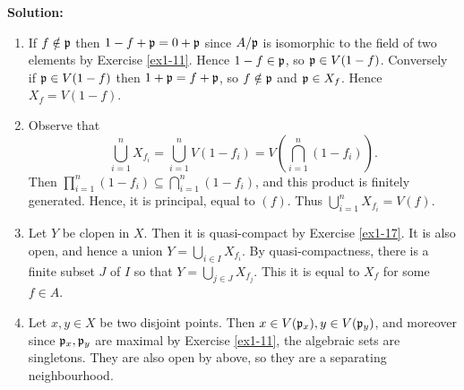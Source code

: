 \documentclass{article}
\begin{document}
\noindent\textbf{Solution:}
\begin{enumerate}
    \item
        If \(f \notin \mathfrak{p}\) then \(1 - f + \mathfrak{p} = 0 + \mathfrak{p}\) since \(A / \mathfrak{p}\) is isomorphic to the field of two elements by Exercise \ref{ex1-11}.
        Hence \(1 - f \in \mathfrak{p}\), so \(\mathfrak{p} \in V(1 - f)\).
        Conversely if \(\mathfrak{p} \in V(1-f)\) then \(1 + \mathfrak{p} = f + \mathfrak{p}\), so \(f \notin \mathfrak{p}\) and \(\mathfrak{p} \in X_f\).
        Hence \(X_f = V(1-f)\).
    \item
        Observe that
        \[
            \bigcup_{i=1}^n X_{f_i} = \bigcup_{i=1}^n V(1 - f_i) = V\left(\bigcap_{i=1}^n (1 - f_i)\right).
        \]
        Then \(\prod_{i=1}^n (1 - f_i) \subseteq \bigcap_{i=1}^n (1 - f_i)\), and this product is finitely generated.
        Hence, it is principal, equal to \((f)\).
        Thus \(\bigcup_{i=1}^n X_{f_i} = V(f)\).
    \item
        Let \(Y\) be clopen in \(X\).
        Then it is quasi-compact by Exercise \ref{ex1-17}.
        It is also open, and hence a union \(Y = \bigcup_{i \in I} X_{f_i}\).
        By quasi-compactness, there is a finite subset \(J\) of \(I\) so that \(Y = \bigcup_{j \in J} X_{f_j}\).
        This it is equal to \(X_f\) for some \(f \in A\).
    \item
        Let \(x, y \in X\) be two disjoint points.
        Then \(x \in V(\mathfrak{p}_x), y \in V(\mathfrak{p}_y)\), and moreover since \(\mathfrak{p}_x, \mathfrak{p}_y\) are maximal by Exercise \ref{ex1-11}, the algebraic sets are singletons.
        They are also open by above, so they are a separating neighbourhood.
\end{enumerate}
\end{document}
